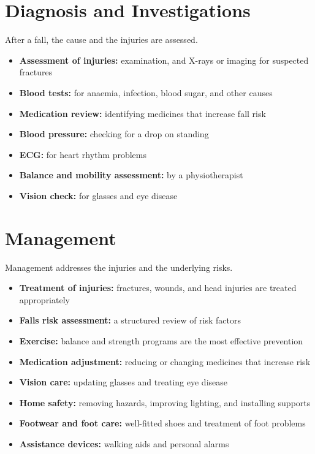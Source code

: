 \section*{Diagnosis and Investigations}
After a fall, the cause and the injuries are assessed.
\begin{itemize}
    \item \textbf{Assessment of injuries:} examination, and X-rays or imaging for suspected fractures
    \item \textbf{Blood tests:} for anaemia, infection, blood sugar, and other causes
    \item \textbf{Medication review:} identifying medicines that increase fall risk
    \item \textbf{Blood pressure:} checking for a drop on standing
    \item \textbf{ECG:} for heart rhythm problems
    \item \textbf{Balance and mobility assessment:} by a physiotherapist
    \item \textbf{Vision check:} for glasses and eye disease
\end{itemize}

\section*{Management}
Management addresses the injuries and the underlying risks.
\begin{itemize}
    \item \textbf{Treatment of injuries:} fractures, wounds, and head injuries are treated appropriately
    \item \textbf{Falls risk assessment:} a structured review of risk factors
    \item \textbf{Exercise:} balance and strength programs are the most effective prevention
    \item \textbf{Medication adjustment:} reducing or changing medicines that increase risk
    \item \textbf{Vision care:} updating glasses and treating eye disease
    \item \textbf{Home safety:} removing hazards, improving lighting, and installing supports
    \item \textbf{Footwear and foot care:} well-fitted shoes and treatment of foot problems
    \item \textbf{Assistance devices:} walking aids and personal alarms
\end{itemize}

